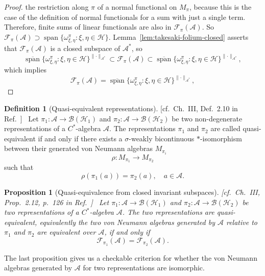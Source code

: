 \documentclass[aps,pra,reprint,superscriptaddress]{revtex4-2}
\newcommand{\cA}{{\mathcal A}}
\newcommand{\cB}{{\mathcal B}}
\newcommand{\cF}{{\mathcal F}}
\newcommand{\cH}{{\mathcal H}}
\providecommand{\norm}[1]{\lVert #1\rVert}
\newcommand{\thmref}[1]{\textnormal{[#1]}\ }
\newtheorem{proposition}[theorem]{Proposition}
\theoremstyle{definition}
\newtheorem{definition}[theorem]{Definition}
\theoremstyle{remark}
\begin{document}
\begin{proof}
the restriction along $\pi$ of a normal functional on $M_\pi$, because this is
the case of the definition of normal functionals for a sum with just a single
term. Therefore, finite sums of linear functionals are
also in $\cF_\pi(\cA)$. So $\cF_\pi(\cA) \supset \operatorname{span}
\{\omega_{\xi,\eta}^\pi : \xi,\eta \in \cH\}$.
Lemma~\ref{lem:takesaki-folium-closed} asserts that $\cF_\pi(\cA)$ is a closed
subspace of $\cA^*$, so
\begin{equation}
    \overline{\operatorname{span}}
    \{\omega_{\xi,\eta}^\pi : \xi,\eta \in \cH\}^{\norm{\cdot}_{\cA^*}}
    \subset
    \cF_\pi(\cA)
    \subset
    \overline{\operatorname{span}}
    \{\omega_{\xi,\eta}^\pi : \xi,\eta \in \cH\}^{\norm{\cdot}_{\cA^*}},
\end{equation}
which implies
\begin{equation}
    \cF_\pi(\cA)
    =
    \overline{\operatorname{span}}
    \{\omega_{\xi,\eta}^\pi : \xi,\eta \in \cH\}^{\norm{\cdot}_{\cA^*}},
\end{equation}
\end{proof}

\begin{definition}[Quasi-equivalent representations]
\thmref{cf.~Ch.~III, Def.~2.10 in Ref.~\cite{TakesakiI}}
Let $\pi_1:\cA \rightarrow \cB(\cH_1)$ and
$\pi_2:\cA \rightarrow \cB(\cH_2)$ be two non-degenerate representations of a $C^\ast$-algebra
$\cA$. The representations $\pi_1$ and $\pi_2$ are called quasi-equivalent if
and only if there exists a $\sigma$-weakly bicontinuous $\ast$-isomorphism between their generated von Neumann algebras $M_{\pi_i}$
\begin{equation}
    \rho:M_{\pi_1} \rightarrow M_{\pi_2}
\end{equation}
such that
\begin{equation}
    \rho(\pi_1(a)) = \pi_2(a),
    \quad a\in\cA.
\end{equation}
\end{definition}
\begin{proposition}[Quasi-equivalence from closed invariant subspaces]\label{prop:equivalence-representations}
\thmref{cf.~Ch.~III, Prop.~2.12, p.~126 in Ref.~\cite{TakesakiI}}
Let $\pi_1:\cA \rightarrow \cB(\cH_1)$ and
$\pi_2:\cA \rightarrow \cB(\cH_2)$ be two representations of a $C^\ast$-algebra
$\cA$. The two representations are quasi-equivalent, equivalently the two von
Neumann algebras generated by $\cA$ relative to $\pi_1$ and $\pi_2$ are
equivalent over $\cA$, if and only if
\begin{equation}
    \cF_{\pi_1}(\cA) = \cF_{\pi_2}(\cA).
\end{equation}
\end{proposition}
The last proposition gives us a checkable criterion for whether the von Neumann
algebras generated by $\cA$ for two representations are isomorphic.
\end{document}
